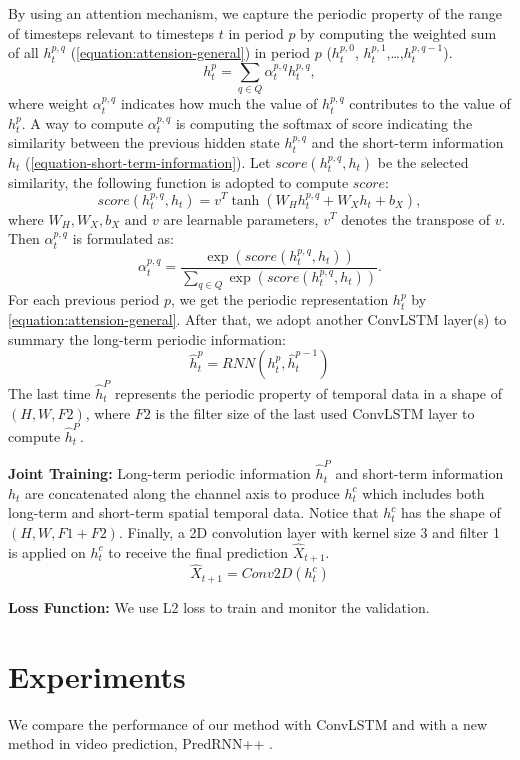 By using an attention mechanism, we capture the periodic property of the range of timesteps relevant to timesteps $t$ in period $p$ by computing the weighted sum of all $h_t^{p, q}$ (\eqref{equation:attension-general}) in period $p$ ($h_t^{p, 0}$, $h_t^{p, 1}$,\dots,$h_t^{p, q-1}$).
\[ h_t^p = \sum_{q \in Q}{\alpha_t^{p,q} h_t^{p,q}}, \label{equation:attension-general} \]
where weight $\alpha_t^{p,q}$ indicates how much the value of $h_t^{p,q}$ contributes to the value of $h_t^p$. A way to compute $\alpha_t^{p,q}$ is computing the softmax of score indicating the similarity between the previous hidden state $h_t^{p,q}$ and the short-term information $h_t$ (\eqref{equation-short-term-information}). Let $score(h_t^{p,q}, h_t)$ be the selected similarity, the following function is adopted to compute $score$: \cite{DBLP:journals/corr/LuongPM15}
\[ score(h_t^{p,q}, h_t) = v^T\tanh(W_H h_t^{p,q} + W_X h_t + b_X), \]
where $W_H, W_X, b_X \mbox{ and } v$ are learnable parameters, $v^T$ denotes the transpose of $v$. Then $\alpha_t^{p,q}$ is formulated as:
\[ \alpha_t^{p,q} = \frac{\exp(score(h_t^{p,q}, h_t))}{\sum_{q \in Q}{\exp(score(h_t^{p,q}, h_t))}}. \]
For each previous period $p$, we get the periodic representation $h_t^p$ by \eqref{equation:attension-general}. After that, we adopt another ConvLSTM layer(s) to summary the long-term periodic information:
\[ \hat{h}_t^p = RNN(h_t^p, \hat{h}_t^{p-1}) \]
The last time $\hat{h}_t^P$ represents the periodic property of temporal data in a shape of $(H, W, F2)$, where $F2$ is the filter size of the last used ConvLSTM layer to compute $\hat{h}_t^P$.

\textbf{Joint Training:}
Long-term periodic information $\hat{h}_t^P$ and short-term information $h_t$ are concatenated along the channel axis to produce $h_t^c$ which includes both long-term and short-term spatial temporal data. Notice that $h_t^c$ has the shape of $(H, W, F1 + F2)$. Finally, a 2D convolution layer with kernel size 3 and filter 1 is applied on $h_t^c$ to receive the final prediction $\hat{X}_{t+1}$.
\[ \hat{X}_{t+1} = Conv2D(h_t^c) \]

\textbf{Loss Function:} We use L2 loss to train and monitor the validation. 

\section{Experiments}
We compare the performance of our method with ConvLSTM and with a new method in video prediction, PredRNN++ \cite{wang2018predrnn}. 

